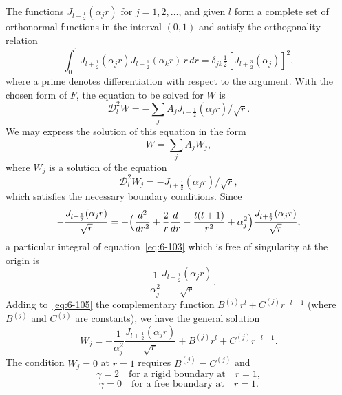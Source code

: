The functions $J_{l+\frac{1}{2}}(\alpha_j r)$ for $j = 1, 2, \ldots$, and given $l$ form a complete
set of orthonormal functions in the interval $(0, 1)$ and satisfy the ortho\-gonality relation
\begin{equation}\label{eq:6-100}
\int_0^1 J_{l+\frac{1}{2}}(\alpha_j r)J_{l+\frac{1}{2}}(\alpha_k r)\,r\,dr = \delta_{jk}\tfrac{1}{2}[J_{l+\frac{3}{2}}(\alpha_j)]^2,
\end{equation}
where a prime denotes differentiation with respect to the argument.
With the chosen form of $F$, the equation to be solved for $W$ is
\begin{equation}\label{eq:6-101}
\mathscr{D}_l^2 W = -\sum_j A_j J_{l+\frac{1}{2}}(\alpha_j r)/\sqrt{r}.
\end{equation}
We may express the solution of this equation in the form
\begin{equation}\label{eq:6-102}
W = \sum_j A_j W_j,
\end{equation}
where $W_j$ is a solution of the equation
\begin{equation}\label{eq:6-103}
\mathscr{D}_l^2 W_j = -J_{l+\frac{1}{2}}(\alpha_j r)/\sqrt{r},
\end{equation}
which satisfies the necessary boundary conditions. Since
\begin{equation}\label{eq:6-104}
-\frac{J_{l+\frac{1}{2}}(\alpha_j r)}{\sqrt{r}} = -\Bigl(\frac{d^2}{dr^2}+\frac{2}{r}\frac{d}{dr}-\frac{l(l+1)}{r^2}+\alpha_j^2\Bigr)\frac{J_{l+\frac{1}{2}}(\alpha_j r)}{\sqrt{r}},
\end{equation}
a particular integral of equation~\eqref{eq:6-103} which is free of singularity at the
origin is
\begin{equation}\label{eq:6-105}
-\frac{1}{\alpha_j^2}\frac{J_{l+\frac{1}{2}}(\alpha_j r)}{\sqrt{r}}.
\end{equation}
Adding to~\eqref{eq:6-105} the complementary function $B^{(j)} r^l + C^{(j)} r^{-l-1}$ (where
$B^{(j)}$ and $C^{(j)}$ are constants), we have the general solution
\begin{equation}\label{eq:6-106}
W_j = -\frac{1}{\alpha_j^2}\frac{J_{l+\frac{1}{2}}(\alpha_j r)}{\sqrt{r}} + B^{(j)}r^l + C^{(j)}r^{-l-1}.
\end{equation}
The condition $W_j = 0$ at $r = 1$ requires $B^{(j)} = C^{(j)}$ and
\begin{equation}\label{eq:6-107}
\gamma = 2 \quad\text{for a rigid boundary at}\quad r = 1,
\end{equation}
\begin{equation}\label{eq:6-108}
\gamma = 0 \quad\text{for a free boundary at}\quad r = 1.
\end{equation}

